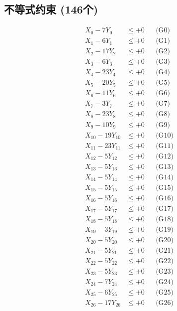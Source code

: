 \documentclass[a4paper,10pt]{article}
\begin{document}
\subsection{不等式约束 (146个)}

\allowdisplaybreaks
{\small
\begin{align}
X_{0} - 7Y_{0} &\leq +0 && \text{(G0)} \\
X_{1} - 6Y_{1} &\leq +0 && \text{(G1)} \\
X_{2} - 17Y_{2} &\leq +0 && \text{(G2)} \\
X_{3} - 6Y_{3} &\leq +0 && \text{(G3)} \\
X_{4} - 23Y_{4} &\leq +0 && \text{(G4)} \\
X_{5} - 20Y_{5} &\leq +0 && \text{(G5)} \\
X_{6} - 11Y_{6} &\leq +0 && \text{(G6)} \\
X_{7} - 3Y_{7} &\leq +0 && \text{(G7)} \\
\allowbreak
X_{8} - 23Y_{8} &\leq +0 && \text{(G8)} \\
X_{9} - 10Y_{9} &\leq +0 && \text{(G9)} \\
X_{10} - 19Y_{10} &\leq +0 && \text{(G10)} \\
X_{11} - 23Y_{11} &\leq +0 && \text{(G11)} \\
X_{12} - 5Y_{12} &\leq +0 && \text{(G12)} \\
X_{13} - 5Y_{13} &\leq +0 && \text{(G13)} \\
X_{14} - 5Y_{14} &\leq +0 && \text{(G14)} \\
X_{15} - 5Y_{15} &\leq +0 && \text{(G15)} \\
X_{16} - 5Y_{16} &\leq +0 && \text{(G16)} \\
X_{17} - 5Y_{17} &\leq +0 && \text{(G17)} \\
\allowbreak
X_{18} - 5Y_{18} &\leq +0 && \text{(G18)} \\
X_{19} - 3Y_{19} &\leq +0 && \text{(G19)} \\
X_{20} - 5Y_{20} &\leq +0 && \text{(G20)} \\
X_{21} - 5Y_{21} &\leq +0 && \text{(G21)} \\
X_{22} - 5Y_{22} &\leq +0 && \text{(G22)} \\
X_{23} - 5Y_{23} &\leq +0 && \text{(G23)} \\
X_{24} - 7Y_{24} &\leq +0 && \text{(G24)} \\
X_{25} - 6Y_{25} &\leq +0 && \text{(G25)} \\
X_{26} - 17Y_{26} &\leq +0 && \text{(G26)} \\

\end{align}}
\end{document}
